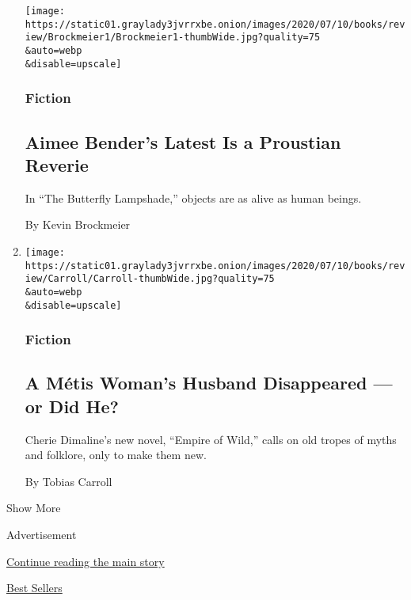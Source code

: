\begin{enumerate}
  \texttt{[image: https://static01.graylady3jvrrxbe.onion/images/2020/07/10/books/review/Brockmeier1/Brockmeier1-thumbWide.jpg?quality=75\\\&auto=webp\\\&disable=upscale]}

  \hypertarget{fiction}{%
  \subsubsection{Fiction}\label{fiction}}

  \hypertarget{aimee-benders-latest-is-a-proustian-reverie}{%
  \subsection{Aimee Bender's Latest Is a Proustian
  Reverie}\label{aimee-benders-latest-is-a-proustian-reverie}}

  In ``The Butterfly Lampshade,'' objects are as alive as human beings.

  By Kevin Brockmeier
\item
  \href{/2020/07/28/books/review/empire-of-wild-cherie-dimaline.html}{}

  \texttt{[image: https://static01.graylady3jvrrxbe.onion/images/2020/07/10/books/review/Carroll/Carroll-thumbWide.jpg?quality=75\\\&auto=webp\\\&disable=upscale]}

  \hypertarget{fiction-1}{%
  \subsubsection{Fiction}\label{fiction-1}}

  \hypertarget{a-muxe9tis-womans-husband-disappeared--or-did-he}{%
  \subsection{A Métis Woman's Husband Disappeared --- or Did
  He?}\label{a-muxe9tis-womans-husband-disappeared--or-did-he}}

  Cherie Dimaline's new novel, ``Empire of Wild,'' calls on old tropes
  of myths and folklore, only to make them new.

  By Tobias Carroll
\end{enumerate}

Show More

Advertisement

\protect\hyperlink{after-mid2}{Continue reading the main story}

\href{https://www.nytimes3xbfgragh.onion/best-sellers-books/overview.html}{Best
Sellers}

